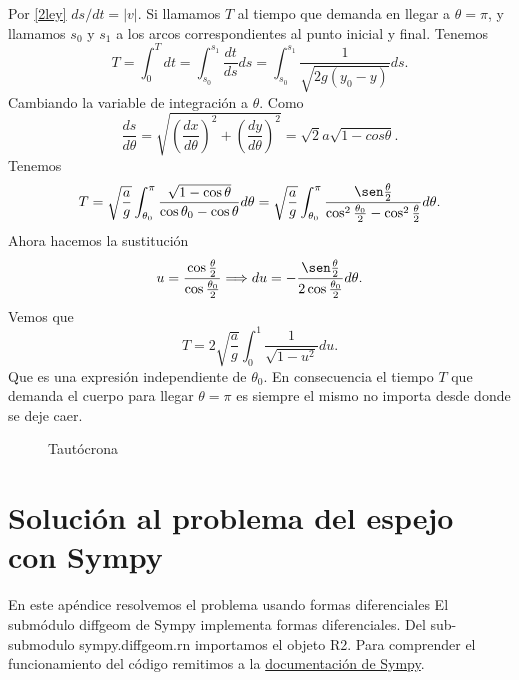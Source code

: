 \begin{subappendices}
  
Por \eqref{2ley} $ds/dt=|v|$. Si llamamos $T$ al tiempo que demanda en llegar a $\theta=\pi$, y llamamos  $s_0$ y $s_1$ a los arcos correspondientes al punto inicial
y final.  Tenemos
 \[T=\int_0^Tdt=\int_{s_0}^{s_1}\frac{dt}{ds}ds=\int_{s_0}^{s_1}\frac{1}{\sqrt{2g(y_0-y)}}ds.\]
Cambiando la variable de integración a $\theta$. Como 
\[
 \frac{ds}{d\theta}=\sqrt{\left(\frac{dx}{d\theta}\right)^2+\left(\frac{dy}{d\theta}\right)^2}=\sqrt{2}a\sqrt{1-cos\theta}.
\]
 Tenemos
\[T=\sqrt{\frac{a}{g}}\int_{\theta_0}^{\pi}\frac{\sqrt{1-\cos\theta}}{\cos\theta_0-\cos\theta}d\theta=
\sqrt{\frac{a}{g}}\int_{\theta_0}^{\pi}\frac{\sen\frac{\theta}{2}}{\cos^2\frac{\theta_0}{2}-\cos^2\frac{\theta}{2}}d\theta.
\]
Ahora hacemos la sustitución
\[u=\frac{\cos\frac{\theta}{2}}{\cos\frac{\theta_0}{2}}\Longrightarrow du=-\frac{\sen\frac{\theta}{2}}{2\cos\frac{\theta_0}{2}}d\theta.\]
Vemos que
\[
 T=2\sqrt{\frac{a}{g}}\int_0^1\frac{1}{\sqrt{1-u^2}}du.
\]
Que es una expresión independiente de $\theta_0$. En consecuencia el tiempo $T$ que demanda  el cuerpo para llegar $\theta=\pi$ es siempre el mismo no importa
desde donde se deje caer.

\begin{figure}[h]
\begin{center}
\end{center}\caption{Tautócrona}\label{fig:tautocrona}
\end{figure}

\section{Solución al problema del espejo con Sympy}
En este apéndice resolvemos el problema usando formas diferenciales
El submódulo diffgeom de Sympy implementa formas diferenciales. Del
sub-submodulo sympy.diffgeom.rn  importamos el objeto R2. 
Para comprender el funcionamiento del código remitimos a la 
\href{http://docs.sympy.org/latest/modules/diffgeom.html}{documentación de Sympy}\link.






\end{subappendices}


  
  
%